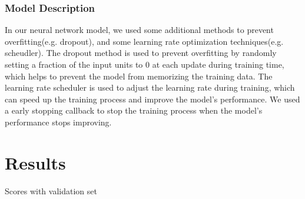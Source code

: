 \documentclass[a4, 10 pt, conference]{ieeeconf}  %
\begin{document}
\subsubsection{Model Description}
In our neural network model, we used some additional methods to prevent overfitting(e.g. dropout), and some learning rate optimization techniques(e.g. scheudler). The dropout method is used to prevent overfitting by randomly
setting a fraction of the input units to 0 at each update during training time, which helps to prevent the model from memorizing the training data. The learning rate scheduler is used to adjust the learning rate during training,
which can speed up the training process and improve the model's performance. We used a early stopping callback to stop the training process when the model's performance stops improving.

\section{Results}
\label{sec:results}



Scores with validation set
\begin{center}
  \begin{table}[!h]

  \end{table}
\end{center}
\end{document}
